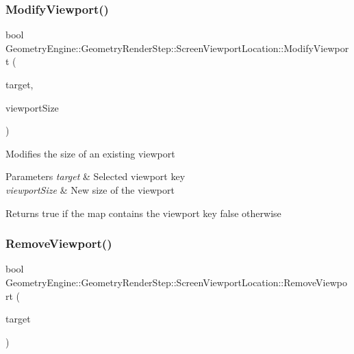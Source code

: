 \subsubsection{\texorpdfstring{ModifyViewport()}{ModifyViewport()}}
{\footnotesize\ttfamily bool Geometry\+Engine\+::\+Geometry\+Render\+Step\+::\+Screen\+Viewport\+Location\+::\+Modify\+Viewport (\begin{DoxyParamCaption}\item[{\mbox{\hyperlink{namespace_geometry_engine_1_1_geometry_world_item_1_1_geometry_camera_a3766848bae97ff8203fa26907ac359ef}{Geometry\+World\+Item\+::\+Geometry\+Camera\+::\+Camera\+Targets}}}]{target,  }\item[{Q\+Vector4D}]{viewport\+Size }\end{DoxyParamCaption})}

Modifies the size of an existing viewport 
\begin{DoxyParams}{Parameters}
{\em target} & Selected viewport key \\
\hline
{\em viewport\+Size} & New size of the viewport \\
\hline
\end{DoxyParams}
\begin{DoxyReturn}{Returns}
true if the map contains the viewport key false otherwise 
\end{DoxyReturn}
\mbox{\label{class_geometry_engine_1_1_geometry_render_step_1_1_screen_viewport_location_a25556391a278bde524476a682772541e}} 
\subsubsection{\texorpdfstring{RemoveViewport()}{RemoveViewport()}}
{\footnotesize\ttfamily bool Geometry\+Engine\+::\+Geometry\+Render\+Step\+::\+Screen\+Viewport\+Location\+::\+Remove\+Viewport (\begin{DoxyParamCaption}\item[{const \mbox{\hyperlink{namespace_geometry_engine_1_1_geometry_world_item_1_1_geometry_camera_a3766848bae97ff8203fa26907ac359ef}{Geometry\+World\+Item\+::\+Geometry\+Camera\+::\+Camera\+Targets}} \&}]{target }\end{DoxyParamCaption})}

